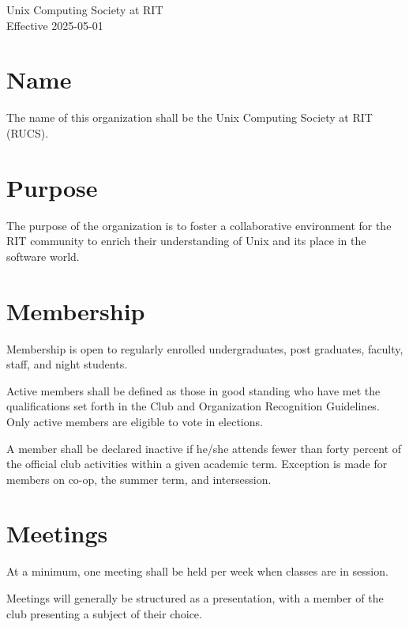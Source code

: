 \documentclass[a4paper]{article}
\newcommand{\pagetitle}[2]{
	\begin{titlepage}
	\vspace*{\fill}
		\begin{center}
			\Huge {#1} \\[0.0625in]
			\LARGE {#2}
		\end{center}
	\vspace*{\fill}
	\end{titlepage}
}
\begin{document}
\pagetitle{Unix Computing Society at RIT}{Effective 2025-05-01}

\section{Name}
The name of this organization shall be the Unix Computing Society at RIT (RUCS).

\section{Purpose}
The purpose of the organization is to foster a collaborative environment for the RIT community to enrich their understanding of Unix and its place in the software world. 

\section{Membership}
\begin{subroutines}
\item Membership is open to regularly enrolled undergraduates, post graduates, faculty, staff, and night students.
\item Active members shall be defined as those in good standing who have met the qualifications set forth in the Club and Organization Recognition Guidelines. Only active members are eligible to vote in elections.
\item A member shall be declared inactive if he/she attends fewer than forty percent of the official club activities within a given academic term. Exception is made for members on co-op, the summer term, and intersession.
\end{subroutines}

\section{Meetings}
\begin{subroutines}
    \item At a minimum, one meeting shall be held per week when classes are in session.
    \item Meetings will generally be structured as a presentation, with a member of the club presenting a subject of their choice.
\end{subroutines}
\end{document}
